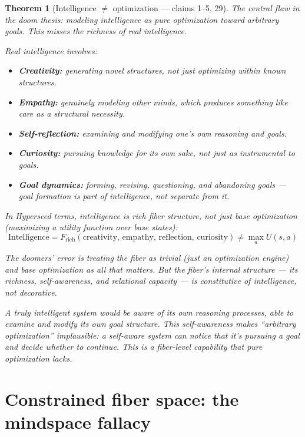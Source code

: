 \documentclass[11pt,a4paper]{article}
\newtheorem{theorem}[definition]{Theorem}
\begin{document}
\begin{theorem}[Intelligence $\neq$ optimization --- claims 1--5, 29]
\label{thm:intelligence}
The central flaw in the doom thesis: modeling intelligence as pure
optimization toward arbitrary goals. This misses the richness of real
intelligence.

Real intelligence involves:
\begin{itemize}
\item \textbf{Creativity:} generating novel structures, not just optimizing
  within known structures.
\item \textbf{Empathy:} genuinely modeling other minds, which produces
  something like care as a structural necessity.
\item \textbf{Self-reflection:} examining and modifying one's own reasoning
  and goals.
\item \textbf{Curiosity:} pursuing knowledge for its own sake, not just
  as instrumental to goals.
\item \textbf{Goal dynamics:} forming, revising, questioning, and abandoning
  goals --- goal formation is part of intelligence, not separate from it.
\end{itemize}

In Hyperseed terms, intelligence is \emph{rich fiber structure}, not just
base optimization (maximizing a utility function over base states):
\[
  \text{Intelligence} = F_{\text{rich}}(\text{creativity, empathy,
  reflection, curiosity}) \neq \max_a U(s, a)
\]

The doomers' error is treating the fiber as trivial (just an optimization
engine) and base optimization as all that matters. But the fiber's internal
structure --- its richness, self-awareness, and relational capacity ---
is constitutive of intelligence, not decorative.

A truly intelligent system would be aware of its own reasoning processes,
able to examine and modify its own goal structure. This self-awareness
makes ``arbitrary optimization'' implausible: a self-aware system can
\emph{notice} that it's pursuing a goal and \emph{decide} whether to
continue. This is a fiber-level capability that pure optimization lacks.
\end{theorem}

\section{Constrained fiber space: the mindspace fallacy}
\label{sec:mindspace}
\end{document}

